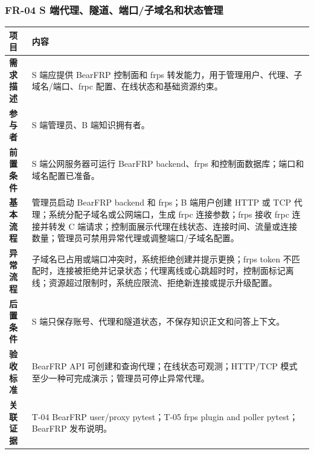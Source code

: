 \documentclass[UTF8,a4paper,12pt,fontset=fandol]{ctexart}
\begin{document}
\subsubsection{FR-04 S 端代理、隧道、端口/子域名和状态管理}
\begin{longtable}{>{\bfseries}p{2.4cm}p{11.8cm}}
\toprule
项目 & 内容 \\
\midrule
需求描述 & S 端应提供 BearFRP 控制面和 frps 转发能力，用于管理用户、代理、子域名/端口、frpc 配置、在线状态和基础资源约束。 \\
参与者 & S 端管理员、B 端知识拥有者。 \\
前置条件 & S 端公网服务器可运行 BearFRP backend、frps 和控制面数据库；端口和域名配置已准备。 \\
基本流程 & 管理员启动 BearFRP backend 和 frps；B 端用户创建 HTTP 或 TCP 代理；系统分配子域名或公网端口，生成 frpc 连接参数；frps 接收 frpc 连接并转发 C 端请求；控制面展示代理在线状态、连接时间、流量或连接数量；管理员可禁用异常代理或调整端口/子域名配置。 \\
异常流程 & 子域名已占用或端口冲突时，系统拒绝创建并提示更换；frps token 不匹配时，连接被拒绝并记录状态；代理离线或心跳超时时，控制面标记离线；资源超过限制时，系统应限流、拒绝新连接或提示升级配置。 \\
后置条件 & S 端只保存账号、代理和隧道状态，不保存知识正文和问答上下文。 \\
验收标准 & BearFRP API 可创建和查询代理；在线状态可观测；HTTP/TCP 模式至少一种可完成演示；管理员可停止异常代理。 \\
关联证据 & T-04 BearFRP user/proxy pytest；T-05 frps plugin and poller pytest；BearFRP 发布说明。 \\
\bottomrule
\end{longtable}
\end{document}
